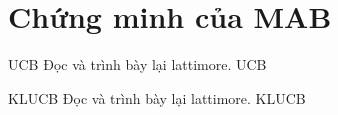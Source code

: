 \section{Chứng minh của MAB}
    \begin{frame}{UCB}
        Đọc và trình bày lại lattimore. UCB
    \end{frame}
    \begin{frame}{KLUCB}
        Đọc và trình bày lại lattimore. KLUCB
    \end{frame}